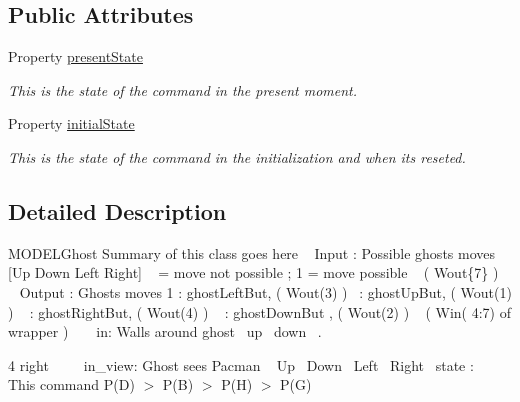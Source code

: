 \subsection*{Public Attributes}
\begin{DoxyCompactItemize}
\item 
Property \hyperlink{class_model_ghost_a9624cc7c421a50fa5086b0ebd0cd5fe3}{present\+State}
\begin{DoxyCompactList}\small\item\em This is the state of the command in the present moment. \end{DoxyCompactList}\item 
Property \hyperlink{class_model_ghost_acd9263acfa96c9138afdf497e55acc24}{initial\+State}
\begin{DoxyCompactList}\small\item\em This is the state of the command in the initialization and when it\textquotesingle{}s reseted. \end{DoxyCompactList}\end{DoxyCompactItemize}


\subsection{Detailed Description}
M\+O\+D\+E\+L\+Ghost Summary of this class goes here ~\newline
 Input \+: Possible ghost\textquotesingle{}s moves \mbox{[}Up Down Left Right\mbox{]} ~ = move not possible ; 1 = move possible ~\newline
 ( Wout\{7\} ) ~\newline
~\newline
 Output \+: Ghost\textquotesingle{}s moves 1 \+: ghost\+Left\+But, ( Wout(3) )~ \+: ghost\+Up\+But, ( Wout(1) ) ~ \+: ghost\+Right\+But, ( Wout(4) ) ~ \+: ghost\+Down\+But , ( Wout(2) ) ~\newline
 ( Win( 4\+:7) of wrapper ) ~\newline
~\newline
 in\+: Walls around ghost~ up~ down~\newline
. 

4 right~\newline
~\newline
~\newline
 in\+\_\+view\+: Ghost sees Pacman ~ Up~ Down~ Left~ Right~\newline
 state \+:~\newline
~\newline
~\newline
 This command P(\+D) $>$ P(\+B) $>$ P(\+H) $>$ P(\+G)~\newline
 

